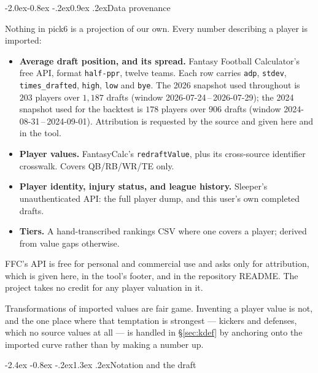 \documentclass[10pt,a4paper]{article}
\makeatletter
\theoremstyle{plain}
\theoremstyle{definition}
\theoremstyle{remark}
\newcommand{\code}[1]{\texttt{\small #1}}
\renewcommand\section{\@startsection{section}{1}{\z@}%
  {-2.4ex \@plus -0.8ex \@minus -.2ex}{1.3ex \@plus.2ex}{\normalfont\Large\bfseries}}
\renewcommand\subsection{\@startsection{subsection}{2}{\z@}%
  {-2.0ex\@plus -0.8ex \@minus -.2ex}{0.9ex \@plus .2ex}{\normalfont\large\bfseries}}
\makeatother
\begin{document}
\subsection{Data provenance}
\label{sec:provenance}

Nothing in pick6 is a projection of our own. Every number describing a player is
imported:

\begin{itemize}
\item \textbf{Average draft position, and its spread.} Fantasy Football Calculator's
free API, format \code{half-ppr}, twelve teams. Each row carries \code{adp},
\code{stdev}, \code{times\_drafted}, \code{high}, \code{low} and \code{bye}. The 2026
snapshot used throughout is $203$ players over $1{,}187$ drafts (window
2026-07-24\,--\,2026-07-29); the 2024 snapshot used for the backtest is $178$ players
over $906$ drafts (window 2024-08-31\,--\,2024-09-01). Attribution is requested by the
source and given here and in the tool.

\item \textbf{Player values.} FantasyCalc's \code{redraftValue}, plus its
cross-source identifier crosswalk. Covers QB/RB/WR/TE only.

\item \textbf{Player identity, injury status, and league history.} Sleeper's
unauthenticated API: the full player dump, and this user's own completed drafts.

\item \textbf{Tiers.} A hand-transcribed rankings CSV where one covers a player;
derived from value gaps otherwise.
\end{itemize}

FFC's API is free for personal and commercial use and asks only for attribution, which is
given here, in the tool's footer, and in the repository README. The project takes no credit
for any player valuation in it.

Transformations of imported values are fair game. Inventing a player value is not, and
the one place where that temptation is strongest --- kickers and defenses, which no
source values at all --- is handled in \S\ref{sec:kdef} by anchoring onto the imported
curve rather than by making a number up.

\section{Notation and the draft}
\label{sec:notation}
\end{document}
